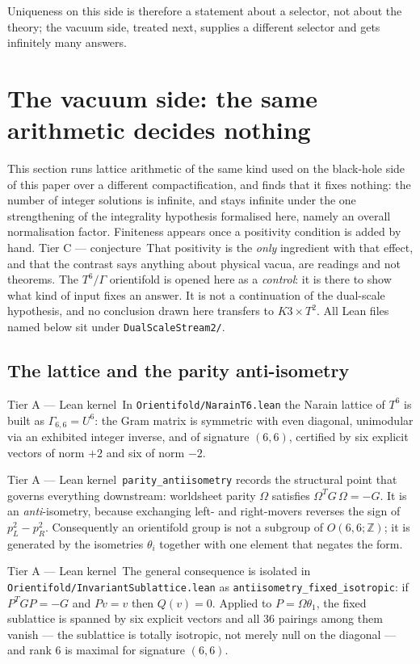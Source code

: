 \documentclass[11pt,a4paper]{article}
\theoremstyle{remark}
\newcommand{\tierA}{\colorbox{green!15}{\textsf{\scriptsize Tier A --- Lean kernel}}}
\newcommand{\tierC}{\colorbox{orange!15}{\textsf{\scriptsize Tier C --- conjecture}}}
\newcommand{\lean}[1]{\texttt{#1}}
\begin{document}
Uniqueness on this side is therefore a statement about a selector, not about the theory; the vacuum side, treated next, supplies a different selector and gets infinitely many answers.


\section{The vacuum side: the same arithmetic decides nothing}\label{sec:vac}

This section runs lattice arithmetic of the same kind used on the black-hole side of this paper over a different
compactification, and finds that it fixes nothing: the number of integer solutions is infinite, and stays
infinite under the one strengthening of the integrality hypothesis formalised here, namely an overall
normalisation factor. Finiteness appears once a positivity condition is added by hand. \tierC\ That positivity
is the \emph{only} ingredient with that effect, and that the contrast says anything about physical vacua, are
readings and not theorems. The $T^6/\Gamma$ orientifold is opened here as a \emph{control}: it is there to show
what kind of input fixes an answer. It is not a continuation of the dual-scale hypothesis, and no conclusion
drawn here transfers to $K3 \times T^2$. All Lean files named below sit under \lean{DualScaleStream2/}.

\subsection{The lattice and the parity anti-isometry}

\tierA\ In \lean{Orientifold/NarainT6.lean} the Narain lattice of $T^6$ is built as $\Gamma_{6,6} = U^{6}$: the
Gram matrix is symmetric with even diagonal, unimodular via an exhibited integer inverse, and of signature
$(6,6)$, certified by six explicit vectors of norm $+2$ and six of norm $-2$.

\tierA\ \lean{parity\_antiisometry} records the structural point that governs everything downstream: worldsheet
parity $\Omega$ satisfies $\Omega^{T} G\, \Omega = -G$. It is an \emph{anti}-isometry, because exchanging left-
and right-movers reverses the sign of $p_L^2 - p_R^2$. Consequently an orientifold group is not a subgroup of
$O(6,6;\mathbb{Z})$; it is generated by the isometries $\theta_i$ together with one element that negates the form.

\tierA\ The general consequence is isolated in \lean{Orientifold/InvariantSublattice.lean} as
\lean{antiisometry\_fixed\_isotropic}: if $P^{T} G P = -G$ and $Pv = v$ then $Q(v) = 0$. Applied to
$P = \Omega\theta_1$, the fixed sublattice is spanned by six explicit vectors and all $36$ pairings among them
vanish --- the sublattice is totally isotropic, not merely null on the diagonal --- and rank $6$ is maximal for
signature $(6,6)$.
\end{document}
